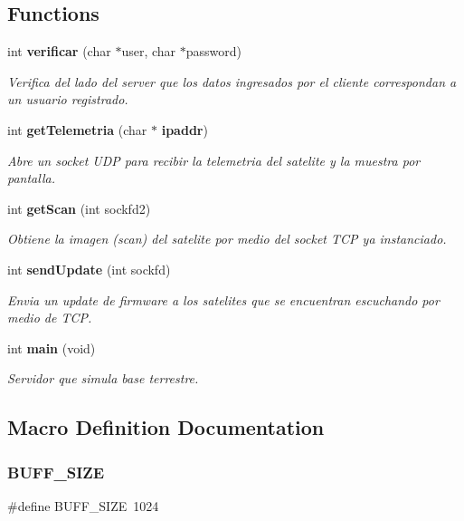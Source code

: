 \subsection*{Functions}
\begin{DoxyCompactItemize}
\item 
int \textbf{ verificar} (char $\ast$user, char $\ast$password)
\begin{DoxyCompactList}\small\item\em Verifica del lado del server que los datos ingresados por el cliente correspondan a un usuario registrado. \end{DoxyCompactList}\item 
int \textbf{ get\+Telemetria} (char $\ast$\textbf{ ipaddr})
\begin{DoxyCompactList}\small\item\em Abre un socket U\+DP para recibir la telemetria del satelite y la muestra por pantalla. \end{DoxyCompactList}\item 
int \textbf{ get\+Scan} (int sockfd2)
\begin{DoxyCompactList}\small\item\em Obtiene la imagen (scan) del satelite por medio del socket T\+CP ya instanciado. \end{DoxyCompactList}\item 
int \textbf{ send\+Update} (int sockfd)
\begin{DoxyCompactList}\small\item\em Envia un update de firmware a los satelites que se encuentran escuchando por medio de T\+CP. \end{DoxyCompactList}\item 
int \textbf{ main} (void)
\begin{DoxyCompactList}\small\item\em Servidor que simula base terrestre. \end{DoxyCompactList}\end{DoxyCompactItemize}


\subsection{Macro Definition Documentation}
\mbox{\label{server_2main_8c_a6c7cd32e1bac137f05e4a752b4ad10af}} 
\subsubsection{BUFF\_SIZE}
{\footnotesize\ttfamily \#define B\+U\+F\+F\+\_\+\+S\+I\+ZE~1024}

